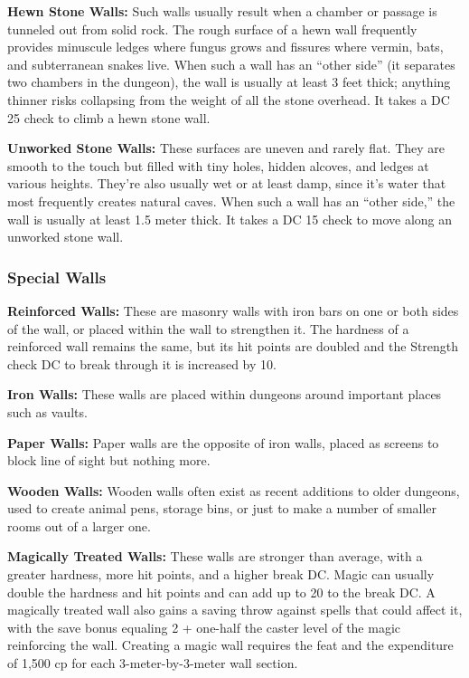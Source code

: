 \textbf{Hewn Stone Walls:} Such walls usually result when a chamber or passage is tunneled out from solid rock. The rough surface of a hewn wall frequently provides minuscule ledges where fungus grows and fissures where vermin, bats, and subterranean snakes live. When such a wall has an ``other side'' (it separates two chambers in the dungeon), the wall is usually at least 3 feet thick; anything thinner risks collapsing from the weight of all the stone overhead. It takes a DC 25  check to climb a hewn stone wall.

\textbf{Unworked Stone Walls:} These surfaces are uneven and rarely flat. They are smooth to the touch but filled with tiny holes, hidden alcoves, and ledges at various heights. They're also usually wet or at least damp, since it's water that most frequently creates natural caves. When such a wall has an ``other side,'' the wall is usually at least 1.5 meter thick. It takes a DC 15  check to move along an unworked stone wall.

\subsubsection{Special Walls}

\textbf{Reinforced Walls:} These are masonry walls with iron bars on one or both sides of the wall, or placed within the wall to strengthen it. The hardness of a reinforced wall remains the same, but its hit points are doubled and the Strength check DC to break through it is increased by 10.

\textbf{Iron Walls:} These walls are placed within dungeons around important places such as vaults.

\textbf{Paper Walls:} Paper walls are the opposite of iron walls, placed as screens to block line of sight but nothing more.

\textbf{Wooden Walls:} Wooden walls often exist as recent additions to older dungeons, used to create animal pens, storage bins, or just to make a number of smaller rooms out of a larger one.

\textbf{Magically Treated Walls:} These walls are stronger than average, with a greater hardness, more hit points, and a higher break DC. Magic can usually double the hardness and hit points and can add up to 20 to the break DC. A magically treated wall also gains a saving throw against spells that could affect it, with the save bonus equaling 2 + one-half the caster level of the magic reinforcing the wall. Creating a magic wall requires the  feat and the expenditure of 1,500 cp for each 3-meter-by-3-meter wall section.


